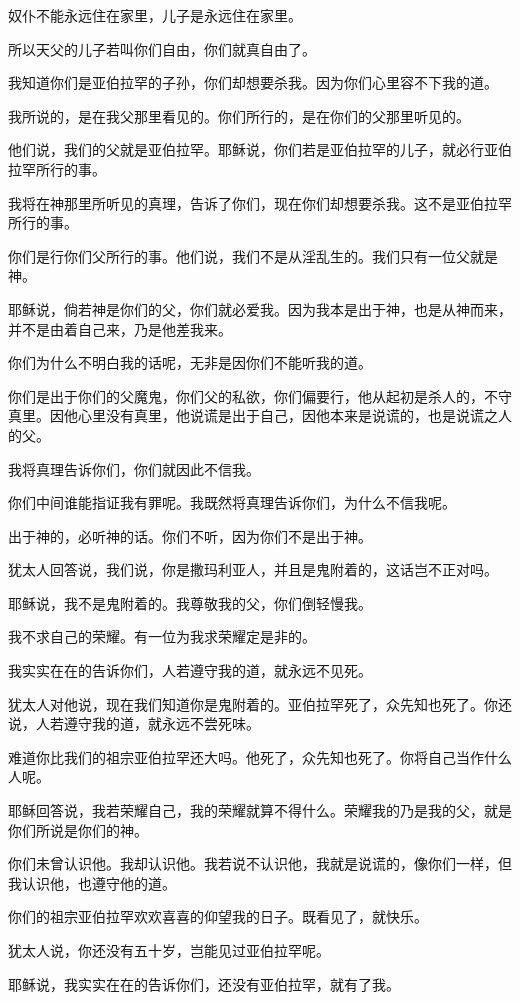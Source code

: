 \documentclass[12pt,oneside]{book}
\begin{document}
奴仆不能永远住在家里，儿子是永远住在家里。

所以天父的儿子若叫你们自由，你们就真自由了。

我知道你们是亚伯拉罕的子孙，你们却想要杀我。因为你们心里容不下我的道。

我所说的，是在我父那里看见的。你们所行的，是在你们的父那里听见的。

他们说，我们的父就是亚伯拉罕。耶稣说，你们若是亚伯拉罕的儿子，就必行亚伯拉罕所行的事。

我将在神那里所听见的真理，告诉了你们，现在你们却想要杀我。这不是亚伯拉罕所行的事。

你们是行你们父所行的事。他们说，我们不是从淫乱生的。我们只有一位父就是神。

耶稣说，倘若神是你们的父，你们就必爱我。因为我本是出于神，也是从神而来，并不是由着自己来，乃是他差我来。

你们为什么不明白我的话呢，无非是因你们不能听我的道。

你们是出于你们的父魔鬼，你们父的私欲，你们偏要行，他从起初是杀人的，不守真里。因他心里没有真里，他说谎是出于自己，因他本来是说谎的，也是说谎之人的父。

我将真理告诉你们，你们就因此不信我。

你们中间谁能指证我有罪呢。我既然将真理告诉你们，为什么不信我呢。

出于神的，必听神的话。你们不听，因为你们不是出于神。

犹太人回答说，我们说，你是撒玛利亚人，并且是鬼附着的，这话岂不正对吗。

耶稣说，我不是鬼附着的。我尊敬我的父，你们倒轻慢我。

我不求自己的荣耀。有一位为我求荣耀定是非的。

我实实在在的告诉你们，人若遵守我的道，就永远不见死。

犹太人对他说，现在我们知道你是鬼附着的。亚伯拉罕死了，众先知也死了。你还说，人若遵守我的道，就永远不尝死味。

难道你比我们的祖宗亚伯拉罕还大吗。他死了，众先知也死了。你将自己当作什么人呢。

耶稣回答说，我若荣耀自己，我的荣耀就算不得什么。荣耀我的乃是我的父，就是你们所说是你们的神。

你们未曾认识他。我却认识他。我若说不认识他，我就是说谎的，像你们一样，但我认识他，也遵守他的道。

你们的祖宗亚伯拉罕欢欢喜喜的仰望我的日子。既看见了，就快乐。

犹太人说，你还没有五十岁，岂能见过亚伯拉罕呢。

耶稣说，我实实在在的告诉你们，还没有亚伯拉罕，就有了我。
\end{document}
